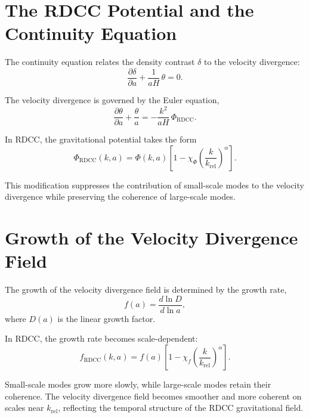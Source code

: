 \documentclass[11pt,a4paper]{article}
\begin{document}
\section{The RDCC Potential and the Continuity Equation}

The continuity equation relates the density contrast $\delta$ to the velocity 
divergence:
\begin{equation}
    \frac{\partial \delta}{\partial a}
    + \frac{1}{aH}\,\theta = 0.
\end{equation}

The velocity divergence is governed by the Euler equation,
\begin{equation}
    \frac{\partial \theta}{\partial a}
    + \frac{\theta}{a}
    = -\frac{k^{2}}{aH}\,\Phi_{\mathrm{RDCC}}.
\end{equation}

In RDCC, the gravitational potential takes the form
\begin{equation}
    \Phi_{\mathrm{RDCC}}(k,a)
    = \Phi(k,a)
      \left[
        1 - \chi_{\Phi}
        \left(\frac{k}{k_{\mathrm{rel}}}\right)^{\alpha}
      \right].
\end{equation}

This modification suppresses the contribution of small-scale modes to the velocity 
divergence while preserving the coherence of large-scale modes.
\section{Growth of the Velocity Divergence Field}

The growth of the velocity divergence field is determined by the growth rate,
\begin{equation}
    f(a) = \frac{d\ln D}{d\ln a},
\end{equation}
where $D(a)$ is the linear growth factor.

In RDCC, the growth rate becomes scale-dependent:
\begin{equation}
    f_{\mathrm{RDCC}}(k,a)
    = f(a)
      \left[
        1 - \chi_{f}
        \left(\frac{k}{k_{\mathrm{rel}}}\right)^{\alpha}
      \right].
\end{equation}

Small-scale modes grow more slowly, while large-scale modes retain their coherence. 
The velocity divergence field becomes smoother and more coherent on scales near 
$k_{\mathrm{rel}}$, reflecting the temporal structure of the RDCC gravitational 
field.
\end{document}
